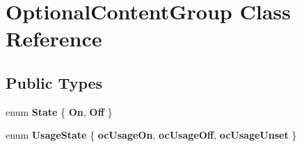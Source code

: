 \hypertarget{class_optional_content_group}{}\section{Optional\+Content\+Group Class Reference}
\label{class_optional_content_group}
\subsection*{Public Types}
\begin{DoxyCompactItemize}
\item 
\mbox{\label{class_optional_content_group_abac51bd11c0f9d88972ce242b5a89ef0}} 
enum {\bfseries State} \{ {\bfseries On}, 
{\bfseries Off}
 \}
\item 
\mbox{\label{class_optional_content_group_a598f8af2d9cb882b7d53e516cec2da30}} 
enum {\bfseries Usage\+State} \{ {\bfseries oc\+Usage\+On}, 
{\bfseries oc\+Usage\+Off}, 
{\bfseries oc\+Usage\+Unset}
 \}
\end{DoxyCompactItemize}
